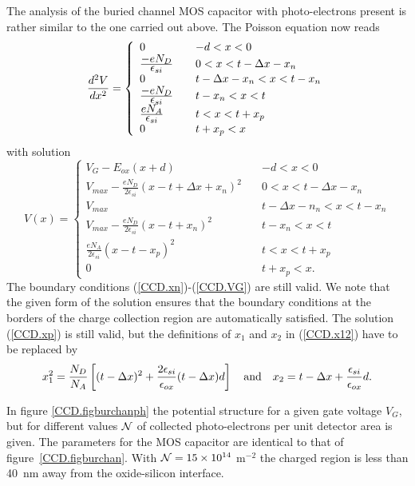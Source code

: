 \documentclass{article}
\newcommand{\dd}[2]{{{d^2#1}\over{d#2^2}}}
\def\cl#1{{\cal #1}}               %
\begin{document}
The analysis of the buried channel MOS capacitor with photo-electrons
present is rather similar to the one carried out above. The Poisson
equation now reads
\begin{equation}
  \dd{V}{x} = \left\{ \begin{array}{ll} 
	0 & -d < x < 0 \\
	\frac{\displaystyle -eN_D}{\displaystyle \epsilon_{si}} \quad &
	0 < x < t-\Delta x -x_n \\
	0 & t-\Delta x -x_n < x < t -x_n \\
	\frac{\displaystyle -eN_D}{\displaystyle \epsilon_{si}} \quad &
	t-x_n < x < t \\
	\frac{\displaystyle eN_A}{\displaystyle\epsilon_{si}} & 
	t < x < t+x_p \\
	0 & t+x_p < x
  \end{array} \right.
  \label{CCD/.Poissonburph}
\end{equation}
with solution
\begin{equation}
  V(x) = \left\{ \begin{array}{ll} 
	V_G-E_{ox}(x+d) & -d < x < 0 \\
	V_{max} - \frac{\displaystyle
	eN_D}{\displaystyle 2\epsilon_{si}} (x-t+\Delta x +x_n)^2 \quad & 
	0 < x < t-\Delta x - x_n \\ 
	V_{max} & t-\Delta x - n_n < x < t - x_n \\
	V_{max} - \frac{\displaystyle
	eN_D}{\displaystyle 2\epsilon_{si}} (x-t+x_n)^2 \quad & 
	t - x_n < x < t \\ 
	\frac{\displaystyle eN_A}{\displaystyle
	2\epsilon_{si}}(x-t-x_p)^2 & t < x < t+x_p \\
	0 & t+x_p < x.
	\end{array} \right.
\end{equation}
The boundary conditions (\ref{CCD.xn})-(\ref{CCD.VG}) are still
valid. We note that the given form of the solution ensures that the
boundary conditions at the borders of the charge collection region are
automatically satisfied. The solution (\ref{CCD.xp}) is still
valid, but the definitions of $x_1$ and $x_2$ in (\ref{CCD.x12}) have
to be replaced by
\begin{equation}
  x_1^2 = \frac{N_D}{N_A}\left[(t-\Delta
  x)^2+\frac{2\epsilon_{si}}{\epsilon_{ox}}(t-\Delta x)d \right] 
  \quad {\rm and} \quad
  x_2 = t-\Delta x+\frac{\epsilon_{si}}{\epsilon_{ox}}d.
  \label{CCD.x12ph}
\end{equation}

In figure \ref{CCD.figburchanph} the potential structure for a given
gate voltage $V_G$, but for different values $\cl N$ of collected
photo-electrons per unit detector area is given. The parameters for
the MOS capacitor are identical to that of figure~\ref{CCD.figburchan}. 
With $\cl N = 15\times 10^{14}$ m$^{-2}$ the
charged region is less than 40~nm away from the oxide-silicon
interface.
\end{document}
